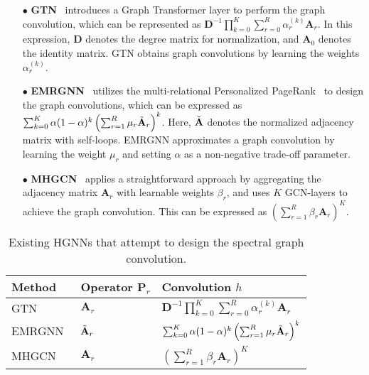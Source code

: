 \documentclass{article}
\begin{document}
\begin{enumerate} \item[$\bullet$] \textbf{GTN}~\cite{gtn} introduces a Graph Transformer layer to perform the graph convolution, which can be represented as  $\mathbf{D}^{-1}\prod\nolimits_{k=0}^{K}\sum\nolimits_{r=0}^{R}\alpha_{r}^{(k)}\mathbf{A}_r$. In this expression, $\mathbf{D}$ denotes the degree matrix for normalization, and $\mathbf{A}_0$ denotes the identity matrix. GTN obtains graph convolutions by learning the weights $\alpha_{r}^{(k)}$.
\item[$\bullet$] \textbf{EMRGNN}~\cite{emrgnn} utilizes the multi-relational Personalized PageRank~\cite{appnp} to design the graph convolutions, which can be expressed as $\sum\nolimits_{k=0}^{K}\alpha(1-\alpha)^k \left(\sum\nolimits_{r=1}^{R}\mu_r\Tilde{\mathbf{A}}_{r} \right)^k$. Here, $\Tilde{\mathbf{A}}$ denotes the normalized adjacency matrix with self-loops. EMRGNN approximates a graph convolution by learning the weight $\mu_r$ and setting $\alpha$ as a non-negative trade-off parameter.
\item[$\bullet$]\textbf{MHGCN}~\cite{mhgcn} 
applies a straightforward approach by aggregating the adjacency matrix $\mathbf{A}_r$ with learnable weights $\beta_r$, and uses $K$ GCN-layers to achieve the graph convolution. This can be expressed as  $\left( 
\sum\nolimits_{r=1}^{R}\beta_r\mathbf{A}_r \right)^{K}$.
\end{enumerate}


\begin{table}[t]
\centering
\caption{Existing HGNNs that attempt to design the spectral graph convolution.}
\vspace{1mm}
\begin{tabular}{@{}lll@{}}
\toprule
Method &Operator $\mathbf{P}_r$  &Convolution $h$  \\ \midrule
GTN~\cite{gtn}    &$\mathbf{A}_r$  &$\mathbf{D}^{-1}\prod\nolimits_{k=0}^{K}\sum\nolimits_{r=0}^{R}\alpha_{r}^{(k)}\mathbf{A}_r$  \\
EMRGNN~\cite{emrgnn} &$\Tilde{\mathbf{A}}_r$  &$\sum\nolimits_{k=0}^{K}\alpha(1-\alpha)^k \left(\sum\nolimits_{r=1}^{R}\mu_r\Tilde{\mathbf{A}}_{r} \right)^k$ \\
MHGCN~\cite{mhgcn}  &$\mathbf{A}_r$  &$\left( 
\sum\nolimits_{r=1}^{R}\beta_r\mathbf{A}_r \right)^{K}$   \\ 
\bottomrule
\end{tabular}
\label{tb:hgnn_with_filter}
\vspace{-4mm}
\end{table}
\end{document}
